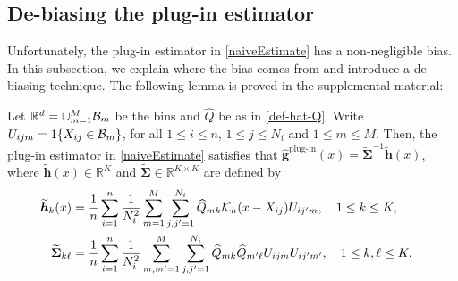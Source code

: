 \documentclass[preprint,11pt]{article}
\def\r#1{\textcolor{red}{\bf #1}}
\numberwithin{equation}{section}
\begin{document}
\subsection{De-biasing the plug-in estimator} \label{subsec:de-biasing}
Unfortunately, the plug-in estimator in \eqref{naiveEstimate} has a non-negligible bias. 
In this subsection, we explain where the bias comes from and introduce a de-biasing technique.  
%
%
%
The following lemma is proved in the supplemental material: 
\begin{lemma} \label{lem:naiveEstimate}
Let $\mathbb{R}^d =\cup_{m=1}^M {\cal B}_m$ be the bins and $\widehat{Q}$ be as in \eqref{def-hat-Q}. Write  $U_{ijm}=1\{X_{ij}\in {\cal B}_m\}$, for all $1\leq i\leq n$, $1\leq j\leq N_i$ and $1\leq m\leq M$. Then, the plug-in estimator in \eqref{naiveEstimate} satisfies that $\widehat{\boldsymbol g}^{\text{plug-in}}(x)=\widetilde{\boldsymbol \Sigma}^{-1}\widetilde{\boldsymbol h}(x)$, where $\widetilde{\boldsymbol h}(x)\in\mathbb{R}^K$ and $\widetilde{\boldsymbol \Sigma} \in\mathbb{R}^{K\times K}$ are defined by
\begin{align*}
\widetilde{\boldsymbol h}_k(x) & = \frac{1}{n}\sum_{i=1}^n \frac{1}{N_i^2}\sum_{m=1}^M\sum_{j,j'=1}^{N_i} \widehat{Q}_{mk} {\cal K}_h(x-X_{ij})U_{ij'm},\quad 1\leq k\leq K,\cr
\widetilde{\boldsymbol \Sigma}_{k\ell} &= \frac{1}{n}\sum_{i=1}^n \frac{1}{N_i^2}\sum_{m, m'=1}^M \sum_{j,j'=1}^{N_i} \widehat{Q}_{mk}\widehat{Q}_{m'\ell}U_{ijm}U_{ij'm'}, \quad 1\leq k,\ell\leq K. 
\end{align*}
\end{lemma}
\end{document}
